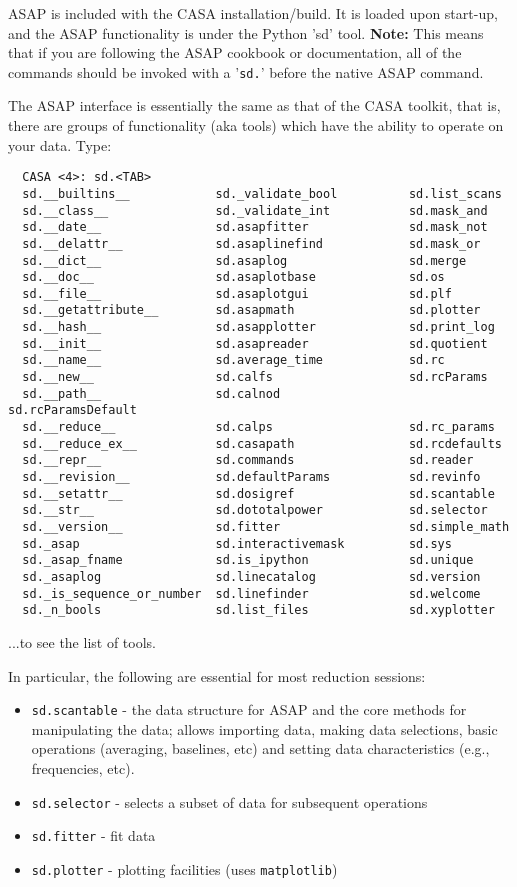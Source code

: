 ASAP is included with the CASA installation/build. It is loaded
upon start-up, and the ASAP functionality is under the
Python 'sd' tool.  {\bf Note:} This means that if you are following
the ASAP cookbook or documentation, all of the commands should be 
invoked with a '{\tt sd.}' before the native ASAP command.

The ASAP interface is essentially the same as that
of the CASA toolkit, that is, there are groups of functionality (aka
tools) which have the ability to operate on your data. Type:

\small
\begin{verbatim}
  CASA <4>: sd.<TAB>
  sd.__builtins__            sd._validate_bool          sd.list_scans
  sd.__class__               sd._validate_int           sd.mask_and
  sd.__date__                sd.asapfitter              sd.mask_not
  sd.__delattr__             sd.asaplinefind            sd.mask_or
  sd.__dict__                sd.asaplog                 sd.merge
  sd.__doc__                 sd.asaplotbase             sd.os
  sd.__file__                sd.asaplotgui              sd.plf
  sd.__getattribute__        sd.asapmath                sd.plotter
  sd.__hash__                sd.asapplotter             sd.print_log
  sd.__init__                sd.asapreader              sd.quotient
  sd.__name__                sd.average_time            sd.rc
  sd.__new__                 sd.calfs                   sd.rcParams
  sd.__path__                sd.calnod                  sd.rcParamsDefault
  sd.__reduce__              sd.calps                   sd.rc_params
  sd.__reduce_ex__           sd.casapath                sd.rcdefaults
  sd.__repr__                sd.commands                sd.reader
  sd.__revision__            sd.defaultParams           sd.revinfo
  sd.__setattr__             sd.dosigref                sd.scantable
  sd.__str__                 sd.dototalpower            sd.selector
  sd.__version__             sd.fitter                  sd.simple_math
  sd._asap                   sd.interactivemask         sd.sys
  sd._asap_fname             sd.is_ipython              sd.unique
  sd._asaplog                sd.linecatalog             sd.version
  sd._is_sequence_or_number  sd.linefinder              sd.welcome
  sd._n_bools                sd.list_files              sd.xyplotter
\end{verbatim}
\normalsize

...to see the list of tools.

In particular, the following are essential for most reduction
sessions: 
\begin{itemize}
   \item {\tt sd.scantable} - the data structure for ASAP and the core
         methods for manipulating the data; allows importing data,
         making data selections, basic operations (averaging,
         baselines, etc) and setting data characteristics (e.g.,
         frequencies, etc).
   \item {\tt sd.selector} - selects a subset of data for subsequent operations
   \item {\tt sd.fitter} - fit data 
   \item {\tt sd.plotter} - plotting facilities (uses {\tt matplotlib})
\end{itemize}

